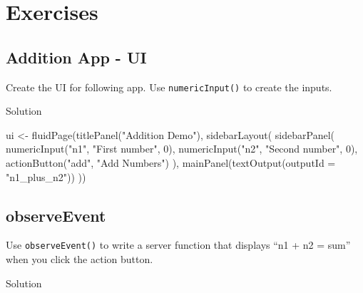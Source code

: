 \documentclass[
  oneside]{book}
\newenvironment{Shaded}{\begin{snugshade}}{\end{snugshade}}
\newcommand{\AttributeTok}[1]{\textcolor[rgb]{0.77,0.63,0.00}{#1}}
\newcommand{\DecValTok}[1]{\textcolor[rgb]{0.00,0.00,0.81}{#1}}
\newcommand{\FunctionTok}[1]{\textcolor[rgb]{0.00,0.00,0.00}{#1}}
\newcommand{\NormalTok}[1]{#1}
\newcommand{\OtherTok}[1]{\textcolor[rgb]{0.56,0.35,0.01}{#1}}
\newcommand{\StringTok}[1]{\textcolor[rgb]{0.31,0.60,0.02}{#1}}
\begin{document}
\hypertarget{exercises-first-app}{%
\section{Exercises}\label{exercises-first-app}}

\hypertarget{addition-app---ui}{%
\subsection*{Addition App - UI}\label{addition-app---ui}}

Create the UI for following app. Use \texttt{numericInput}\texttt{()} to create the inputs.

Solution

\begin{Shaded}
\begin{Highlighting}[]
\NormalTok{ui }\OtherTok{\textless{}{-}} \FunctionTok{fluidPage}\NormalTok{(}\FunctionTok{titlePanel}\NormalTok{(}\StringTok{"Addition Demo"}\NormalTok{),}
                \FunctionTok{sidebarLayout}\NormalTok{(}
                  \FunctionTok{sidebarPanel}\NormalTok{(}
                    \FunctionTok{numericInput}\NormalTok{(}\StringTok{"n1"}\NormalTok{, }\StringTok{"First number"}\NormalTok{, }\DecValTok{0}\NormalTok{),}
                    \FunctionTok{numericInput}\NormalTok{(}\StringTok{"n2"}\NormalTok{, }\StringTok{"Second number"}\NormalTok{, }\DecValTok{0}\NormalTok{),}
                    \FunctionTok{actionButton}\NormalTok{(}\StringTok{"add"}\NormalTok{, }\StringTok{"Add Numbers"}\NormalTok{)}
\NormalTok{                  ),}
                  \FunctionTok{mainPanel}\NormalTok{(}\FunctionTok{textOutput}\NormalTok{(}\AttributeTok{outputId =} \StringTok{"n1\_plus\_n2"}\NormalTok{))}
\NormalTok{                ))}
\end{Highlighting}
\end{Shaded}

\hypertarget{observeevent}{%
\subsection*{observeEvent}\label{observeevent}}

Use \texttt{observeEvent}\texttt{()} to write a server function that displays ``n1 + n2 = sum'' when you click the action button.

Solution
\end{document}
